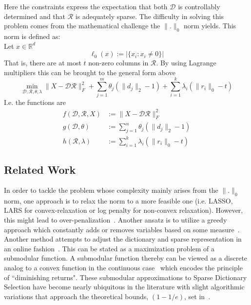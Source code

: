 \documentclass{article}
\newcommand{\R}{\mathbb{R}}
\newcommand{\Rr}{\mathcal{R}}
\newcommand{\D}{\mathcal{D}}
\begin{document}
\noindent Here the constraints express the expectation that both $\D$ is controllably determined and that $\Rr$ is adequately sparse. The difficulty in solving this problem comes from the mathematical challenge the $\| . \|_0$ norm yields. This norm is defined as:\\ 

\qquad\qquad\qquad\qquad Let $x \in \R^d$
\[
\ell_0(x) := \big|\{x_i : x_i \not= 0\}\big|
\]That is, there are at most $t$ non-zero columns in $\Rr$. By using Lagrange multipliers this can be brought to the general form above
\[
\min_{\D, \Rr, \theta, \lambda} \|X  -\D\Rr\|_F^2 + \sum_{j=1}^m \theta_j (\| d_j\|_2 - 1)+ \sum_{i=1}^k \lambda_i (\| r_i \|_0 - t)
\]
I.e. the functions are
\[
\begin{split}
f(\D, \Rr, X) &:= \| X -\D \Rr \|_F^2 \\
g(\D, \theta) &:= \sum_{j=1}^n \theta_j (\| d_j\|_2 - 1) \\
h(\Rr, \lambda) &:= \sum_{i=1}^k \lambda_i (\| r_i \|_0 - t)
\end{split}
\]


\subsection{Related Work}\label{sec:prior-work}

In order to tackle the problem whose complexity mainly arises from the $\| .\|_0$ norm, one approach is to relax the norm to a more feasible one (i.e. LASSO, LARS for convex-relaxation or log penalty for non-convex relaxation). However, this might lead to over-penalization~\cite{nonconvexrelax}. Another ansatz is to utilize a greedy approach which constantly adds or removes variables based on some measure~\cite{submod_spectral}.  Another method attempts to adjust the dictionary and sparse representation in an online fashion~\cite{mairal09}. This can be stated as a maximization problem of a submodular function. A submodular function thereby can be viewed as a discrete analog to a convex function in the continuous case~\cite{submod_sparsecoding} which encodes the principle of ``diminishing returns". These submodular approximations to Sparse Dictionary Selection have become nearly ubiquitous in the literature with slight algorithmic variations that approach the theoretical bounds, $(1 - 1/e)$, set in~\cite{Krause05near-optimalnonmyopic}.
\\
\end{document}
